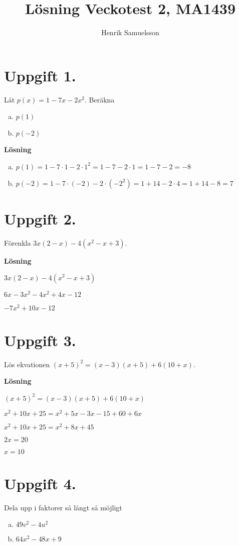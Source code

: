 \documentclass{article}
\begin{document}
\begin{titlepage}
\title{Lösning Veckotest 2, MA1439}
\author{Henrik Samuelsson}
\maketitle
\thispagestyle{empty}
\end{titlepage}

\section*{Uppgift 1.} 
Låt $p(x)=1-7x-2x^2$. Beräkna

\begin{enumerate}[(a)]
\item $p(1)$
\item $p(-2)$
\end{enumerate}

\textbf{Lösning}

\begin{enumerate}[(a)]
\item $p(1) = 1 - 7 \cdot 1 - 2 \cdot 1^2 = 1 - 7 - 2 \cdot 1 = 1 - 7 - 2 = -8$
\item $p(-2)= 1 - 7 \cdot (-2) - 2 \cdot (-2^2) = 1 + 14 - 2\cdot 4 = 1 + 14 - 8 = 7$
\end{enumerate}

\section*{Uppgift 2.} 
Förenkla $3x(2-x)-4(x^2-x+3)$.

\textbf{Lösning}

$3x(2-x)-4(x^2-x+3)$

$6x-3x^2-4x^2+4x-12$

$-7x^2+10x-12$

\section*{Uppgift 3.} 
Lös ekvationen $(x+5)^2=(x-3)(x+5)+6(10+x)$.

\textbf{Lösning}

$(x+5)^2=(x-3)(x+5)+6(10+x)$

$x^2+10x+25=x^2+5x-3x-15+60+6x$

$x^2+10x+25=x^2+8x+45$

$2x=20$

$x=10$

\section*{Uppgift 4.} 
Dela upp i faktorer så långt så möjligt
\begin{enumerate}[(a)]
\item $49v^2-4u^2$
\item $64x^2-48x+9$
\end{enumerate}
\end{document}

